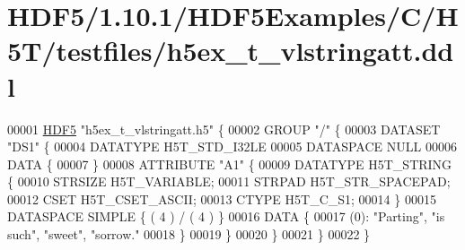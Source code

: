 \hypertarget{_h_d_f5_21_810_81_2_h_d_f5_examples_2_c_2_h5_t_2testfiles_2h5ex__t__vlstringatt_8ddl_source}{}\section{H\+D\+F5/1.10.1/\+H\+D\+F5\+Examples/\+C/\+H5\+T/testfiles/h5ex\+\_\+t\+\_\+vlstringatt.ddl}
\label{_h_d_f5_21_810_81_2_h_d_f5_examples_2_c_2_h5_t_2testfiles_2h5ex__t__vlstringatt_8ddl_source}

\begin{DoxyCode}
00001 \hyperlink{namespace_h_d_f5}{HDF5} \textcolor{stringliteral}{"h5ex\_t\_vlstringatt.h5"} \{
00002 GROUP \textcolor{stringliteral}{"/"} \{
00003    DATASET \textcolor{stringliteral}{"DS1"} \{
00004       DATATYPE  H5T\_STD\_I32LE
00005       DATASPACE  NULL
00006       DATA \{
00007       \}
00008       ATTRIBUTE \textcolor{stringliteral}{"A1"} \{
00009          DATATYPE  H5T\_STRING \{
00010             STRSIZE H5T\_VARIABLE;
00011             STRPAD H5T\_STR\_SPACEPAD;
00012             CSET H5T\_CSET\_ASCII;
00013             CTYPE H5T\_C\_S1;
00014          \}
00015          DATASPACE  SIMPLE \{ ( 4 ) / ( 4 ) \}
00016          DATA \{
00017          (0): \textcolor{stringliteral}{"Parting"}, \textcolor{stringliteral}{"is such"}, \textcolor{stringliteral}{"sweet"}, \textcolor{stringliteral}{"sorrow."}
00018          \}
00019       \}
00020    \}
00021 \}
00022 \}
\end{DoxyCode}
